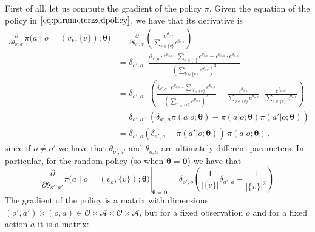 First of all, let us compute the gradient of the policy $\pi$. Given the equation of the policy in $\eqref{eq:parameterizedpolicy}$, we have that its derivative is
\begin{equation}
    \begin{aligned}
        \frac{\partial}{\partial \theta_{o',a'}} \pi \Big( a \;\big|\; o=(v_k, \{v\}); \boldsymbol \theta \Big)
        &= \frac{\partial}{\partial \theta_{o',a'}} \left( \frac{e^{\theta_{o,a} }}{\sum_{b \in \{v\}} e^{\theta_{o,b} }} \right) \\
        &= \delta_{o',o} \cdot \frac{\delta_{a',a} \cdot e^{\theta_{o,a} } \cdot \sum_{b \in \{v\}} e^{\theta_{o,b} } -  e^{\theta_{o,a} } \cdot e^{\theta_{o, a'} }}{(\sum_{b \in \{v\}} e^{\theta_{o,b}})^2} \\
        &= \delta_{o',o} \cdot \left( \frac{\delta_{a',a} \cdot e^{\theta_{o,a} } \cdot \sum_{b \in \{v\}} e^{\theta_{o,b} }}{(\sum_{b \in \{v\}} e^{\theta_{o,b} })^2} - \frac{e^{\theta_{o,a} }}{\sum_{b \in \{v\}} e^{\theta_{o,b} }}\cdot\frac{e^{\theta_{o,a'} }}{\sum_{b \in \{v\}} e^{\theta_{o,b} }} \right) \\
        &= \delta_{o',o} \cdot \left( \delta_{a',a} \pi(a|o; \boldsymbol \theta) - \pi(a|o; \boldsymbol \theta) \pi(a'|o; \boldsymbol \theta) \right) \\
        &= \delta_{o',o} \left( \delta_{a',a} - \pi(a'|o; \boldsymbol \theta) \right) \, \pi(a|o; \boldsymbol \theta)  \, ,
    \end{aligned}
    \label{eq:gradpi}
\end{equation}
since if $o \neq o'$ we have that $\theta_{o',a'}$ and $\theta_{o,a}$ are ultimately different parameters. In particular, for the random policy (so when $\boldsymbol \theta = \mathbf 0$) we have that
\begin{equation}
    \left. \frac{\partial}{\partial \theta_{o',a'}} \pi \Big( a \;\big|\; o=(v_k, \{v\}); \boldsymbol \theta \Big) \right|_{\boldsymbol \theta = \mathbf 0}
    = \delta_{o',o} \left(\frac1{|\{v\}|} \delta_{a',a} - \frac1{|\{v\}|^2} \right)
    \label{eq:deriv-pi}
\end{equation}
The gradient of the policy is a matrix with dimensions $(o',a') \times (o,a) \in \mathcal O \times \mathcal A \times \mathcal O \times \mathcal A$, but for a fixed observation $o$ and for a fixed action $a$ it is a matrix:
